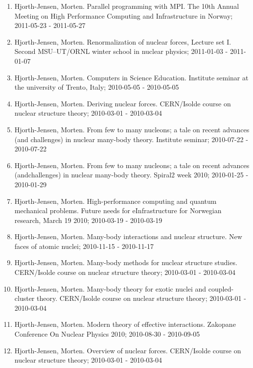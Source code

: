 \documentclass[a4wide,10pt]{article}
\begin{document}
\begin{enumerate}
\item Hjorth-Jensen, Morten.  Parallel programming with MPI. The 10th Annual Meeting on High Performance Computing and Infrastructure in Norway; 2011-05-23 - 2011-05-27

\item Hjorth-Jensen, Morten.  Renormalization of nuclear forces, Lecture set I. Second MSU--UT/ORNL winter school in nuclear physics; 2011-01-03 - 2011-01-07

\item Hjorth-Jensen, Morten.  Computers in Science Education. Institute seminar at the university of Trento, Italy; 2010-05-05 - 2010-05-05

\item Hjorth-Jensen, Morten.  Deriving nuclear forces. CERN/Isolde course on nuclear structure theory; 2010-03-01 - 2010-03-04

\item Hjorth-Jensen, Morten.  From few to many nucleons; a tale on recent advances (and challenges) in nuclear many-body theory. Institute seminar; 2010-07-22 - 2010-07-22

\item Hjorth-Jensen, Morten.  From few to many nucleons; a tale on recent advances (andchallenges) in nuclear many-body theory. Spiral2 week 2010; 2010-01-25 - 2010-01-29

\item Hjorth-Jensen, Morten.  High-performance computing and quantum mechanical problems. Future needs for eInfrastructure for Norwegian research, March 19 2010; 2010-03-19 - 2010-03-19

\item Hjorth-Jensen, Morten.  Many-body interactions and nuclear structure. New faces of atomic nuclei; 2010-11-15 - 2010-11-17

\item Hjorth-Jensen, Morten.  Many-body methods for nuclear structure studies. CERN/Isolde course on nuclear structure theory; 2010-03-01 - 2010-03-04

\item Hjorth-Jensen, Morten.  Many-body theory for exotic nuclei and coupled-cluster theory. CERN/Isolde course on nuclear structure theory; 2010-03-01 - 2010-03-04

\item Hjorth-Jensen, Morten.  Modern theory of effective interactions. Zakopane Conference On Nuclear Physics 2010; 2010-08-30 - 2010-09-05

\item Hjorth-Jensen, Morten.  Overview of nuclear forces. CERN/Isolde course on nuclear structure theory; 2010-03-01 - 2010-03-04


\end{enumerate}
\end{document}
